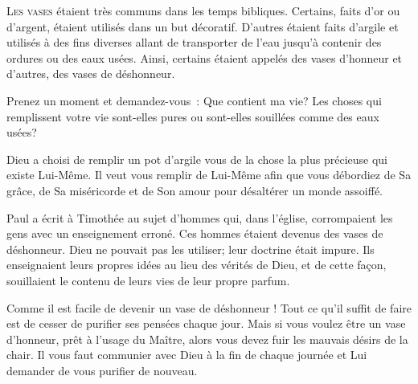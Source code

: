 
\lettrine{L}{es vases} étaient très communs dans les temps bibliques.
 Certains, faits d'or ou d'argent, étaient utilisés dans un but décoratif.
 D'autres étaient faits d'argile et utilisés à des fins diverses
 allant de transporter de l'eau jusqu'à contenir des ordures
 ou des eaux usées. Ainsi, certains étaient appelés des vases d'honneur
 et d'autres, des vases de déshonneur.

Prenez un moment et demandez-vous~: 
 \Og Que contient ma vie? \Fg {}
 Les choses qui remplissent votre vie sont-elles
 pures ou sont-elles souillées comme des eaux usées? 


Dieu a choisi de remplir un pot d'argile \ocadr vous \fcadr{}
 de la chose la plus précieuse qui existe \ocadr Lui-Même.
 Il veut vous remplir de Lui-Même afin que vous débordiez de Sa grâce,
 de Sa miséricorde et de Son amour pour désaltérer un monde assoiffé.

Paul a écrit à Timothée au sujet d'hommes qui, dans l'église,
 corrompaient les gens avec un enseignement erroné.
 Ces hommes étaient devenus des vases de déshonneur.
 Dieu ne pouvait pas les utiliser; leur doctrine était impure.
 Ils enseignaient leurs propres idées au lieu des vérités de Dieu,
 et de cette fa\c{c}on, souillaient le contenu de leurs vies
 de leur propre parfum. 

Comme il est facile de devenir un vase de déshonneur !
 Tout ce qu'il suffit de faire est de cesser de purifier ses pensées
 chaque jour. Mais si vous voulez être un vase d'honneur,
 prêt à l'usage du Maître, alors vous devez fuir les mauvais désirs
 de la chair. Il vous faut communier avec Dieu à la fin de chaque journée
 et Lui demander de vous purifier de nouveau. 

\dvrule







